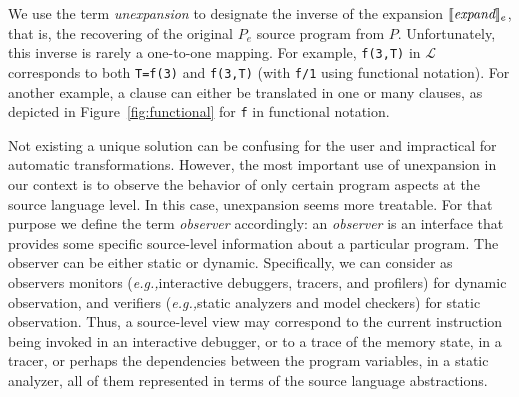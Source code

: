 \documentclass[preprint]{llncs}
\newcommand{\eg}{\emph{e.g.,\xspace}}
\begin{document}
We use the term \emph{unexpansion} to designate the inverse of the
expansion $\llbracket \textit{expand} \rrbracket_e$, that is, the recovering of the original
$P_e$ source program
from $P$. Unfortunately, this inverse is rarely a one-to-one mapping.
For example, \verb|f(3,T)| in $\mathcal{L}$ corresponds to both
\verb|T=f(3)| and \verb|f(3,T)| (with \verb|f/1| using functional
notation). For another example, a clause can either be translated
in one or many clauses, as depicted in Figure~\ref{fig:functional} 
for  \verb|f| in functional notation.

Not existing a unique solution can be confusing for the
user and impractical for automatic transformations.
However, the most important use of unexpansion in our context is to
observe the behavior of only certain program aspects at the source
language level. In this case, unexpansion seems more treatable. For
that purpose we define the term \emph{observer} accordingly:
an \emph{observer} is an interface that provides some specific
source-level information about a particular program. The observer can
be either static or dynamic. Specifically, we can consider as
observers monitors (\eg interactive debuggers, tracers, and profilers)
for dynamic observation, and verifiers (\eg static analyzers and model
checkers) for static observation. Thus, a source-level view may
correspond to the current instruction being invoked in an interactive
debugger, or to a trace of the memory state, in a tracer, or perhaps
the dependencies between the program variables, in a static analyzer,
all of them represented in terms of the source language abstractions.
\end{document}
